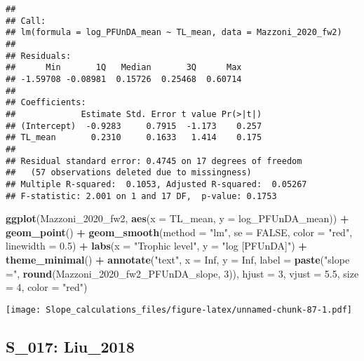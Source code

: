 \documentclass[
]{article}
\newenvironment{Shaded}{\begin{snugshade}}{\end{snugshade}}
\newcommand{\AttributeTok}[1]{\textcolor[rgb]{0.13,0.29,0.53}{#1}}
\newcommand{\ConstantTok}[1]{\textcolor[rgb]{0.56,0.35,0.01}{#1}}
\newcommand{\DecValTok}[1]{\textcolor[rgb]{0.00,0.00,0.81}{#1}}
\newcommand{\FloatTok}[1]{\textcolor[rgb]{0.00,0.00,0.81}{#1}}
\newcommand{\FunctionTok}[1]{\textcolor[rgb]{0.13,0.29,0.53}{\textbf{#1}}}
\newcommand{\NormalTok}[1]{#1}
\newcommand{\SpecialCharTok}[1]{\textcolor[rgb]{0.81,0.36,0.00}{\textbf{#1}}}
\newcommand{\StringTok}[1]{\textcolor[rgb]{0.31,0.60,0.02}{#1}}
\begin{document}
\begin{verbatim}
## 
## Call:
## lm(formula = log_PFUnDA_mean ~ TL_mean, data = Mazzoni_2020_fw2)
## 
## Residuals:
##      Min       1Q   Median       3Q      Max 
## -1.59708 -0.08981  0.15726  0.25468  0.60714 
## 
## Coefficients:
##             Estimate Std. Error t value Pr(>|t|)
## (Intercept)  -0.9283     0.7915  -1.173    0.257
## TL_mean       0.2310     0.1633   1.414    0.175
## 
## Residual standard error: 0.4745 on 17 degrees of freedom
##   (57 observations deleted due to missingness)
## Multiple R-squared:  0.1053, Adjusted R-squared:  0.05267 
## F-statistic: 2.001 on 1 and 17 DF,  p-value: 0.1753
\end{verbatim}

\begin{Shaded}
\begin{Highlighting}[]
\FunctionTok{ggplot}\NormalTok{(Mazzoni\_2020\_fw2, }\FunctionTok{aes}\NormalTok{(}\AttributeTok{x =}\NormalTok{ TL\_mean, }\AttributeTok{y =}\NormalTok{ log\_PFUnDA\_mean)) }\SpecialCharTok{+}
  \FunctionTok{geom\_point}\NormalTok{() }\SpecialCharTok{+}
  \FunctionTok{geom\_smooth}\NormalTok{(}\AttributeTok{method =} \StringTok{"lm"}\NormalTok{, }\AttributeTok{se =} \ConstantTok{FALSE}\NormalTok{, }\AttributeTok{color =} \StringTok{"red"}\NormalTok{, }\AttributeTok{linewidth =} \FloatTok{0.5}\NormalTok{) }\SpecialCharTok{+}
  \FunctionTok{labs}\NormalTok{(}\AttributeTok{x =} \StringTok{"Trophic level"}\NormalTok{,}
       \AttributeTok{y =} \StringTok{"log [PFUnDA]"}\NormalTok{) }\SpecialCharTok{+}
  \FunctionTok{theme\_minimal}\NormalTok{() }\SpecialCharTok{+}
  \FunctionTok{annotate}\NormalTok{(}\StringTok{"text"}\NormalTok{, }\AttributeTok{x =} \ConstantTok{Inf}\NormalTok{, }\AttributeTok{y =} \ConstantTok{Inf}\NormalTok{, }\AttributeTok{label =} \FunctionTok{paste}\NormalTok{(}\StringTok{"slope ="}\NormalTok{, }\FunctionTok{round}\NormalTok{(Mazzoni\_2020\_fw2\_PFUnDA\_slope, }\DecValTok{3}\NormalTok{)), }
           \AttributeTok{hjust =} \DecValTok{3}\NormalTok{, }\AttributeTok{vjust =} \FloatTok{5.5}\NormalTok{, }\AttributeTok{size =} \DecValTok{4}\NormalTok{, }\AttributeTok{color =} \StringTok{"red"}\NormalTok{)}
\end{Highlighting}
\end{Shaded}

\texttt{[image: Slope\_calculations\_files/figure-latex/unnamed-chunk-87-1.pdf]}

\subsection{S\_017: Liu\_2018}\label{s_017-liu_2018-1}
\end{document}
